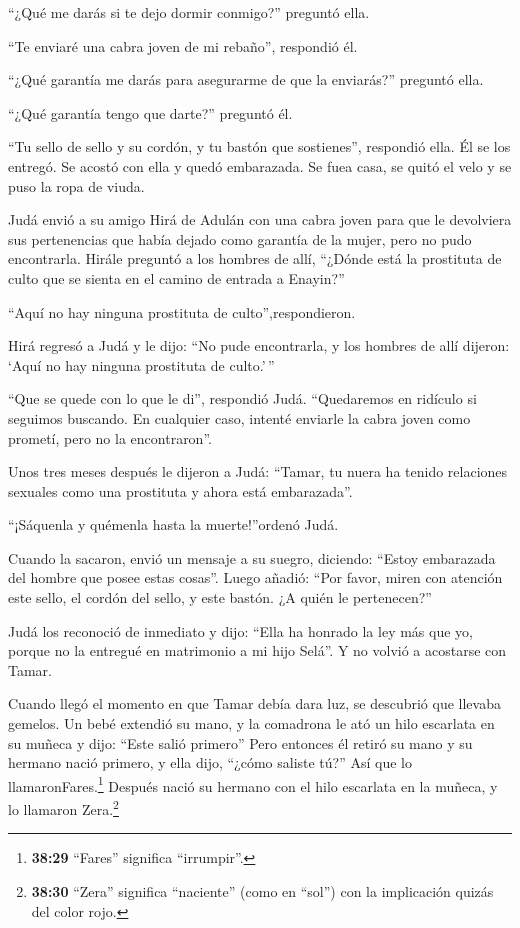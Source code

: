 ``¿Qué me darás si te dejo dormir conmigo?'' preguntó ella.

 ``Te enviaré una cabra joven de mi rebaño'', respondió él.

``¿Qué garantía me darás para asegurarme de que la enviarás?'' preguntó
ella.

 ``¿Qué garantía tengo que darte?'' preguntó él.

``Tu sello de sello y su cordón, y tu bastón que sostienes'', respondió
ella. Él se los entregó. Se acostó con ella y quedó embarazada.
 Se fuea casa, se quitó el velo y se puso la ropa de viuda.

 Judá envió a su amigo Hirá de Adulán con una cabra joven
para que le devolviera sus pertenencias que había dejado como garantía
de la mujer, pero no pudo encontrarla.  Hirále preguntó a
los hombres de allí, ``¿Dónde está la prostituta de culto que se sienta
en el camino de entrada a Enayin?''

``Aquí no hay ninguna prostituta de culto'',respondieron.

 Hirá regresó a Judá y le dijo: ``No pude encontrarla, y
los hombres de allí dijeron: `Aquí no hay ninguna prostituta de
culto.'\,''

 ``Que se quede con lo que le di'', respondió Judá.
``Quedaremos en ridículo si seguimos buscando. En cualquier caso,
intenté enviarle la cabra joven como prometí, pero no la encontraron''.

 Unos tres meses después le dijeron a Judá: ``Tamar, tu
nuera ha tenido relaciones sexuales como una prostituta y ahora está
embarazada''.

``¡Sáquenla y quémenla hasta la muerte!''ordenó Judá.

 Cuando la sacaron, envió un mensaje a su suegro, diciendo:
``Estoy embarazada del hombre que posee estas cosas''. Luego añadió:
``Por favor, miren con atención este sello, el cordón del sello, y este
bastón. ¿A quién le pertenecen?''

 Judá los reconoció de inmediato y dijo: ``Ella ha honrado
la ley más que yo, porque no la entregué en matrimonio a mi hijo Selá''.
Y no volvió a acostarse con Tamar.

 Cuando llegó el momento en que Tamar debía dara luz, se
descubrió que llevaba gemelos.  Un bebé extendió su mano, y
la comadrona le ató un hilo escarlata en su muñeca y dijo: ``Este salió
primero''  Pero entonces él retiró su mano y su hermano
nació primero, y ella dijo, ``¿cómo saliste tú?'' Así que lo
llamaronFares.\footnote{\textbf{38:29} ``Fares'' significa ``irrumpir''.}
 Después nació su hermano con el hilo escarlata en la
muñeca, y lo llamaron Zera.\footnote{\textbf{38:30} ``Zera'' significa
  ``naciente'' (como en ``sol'') con la implicación quizás del color
  rojo.}

